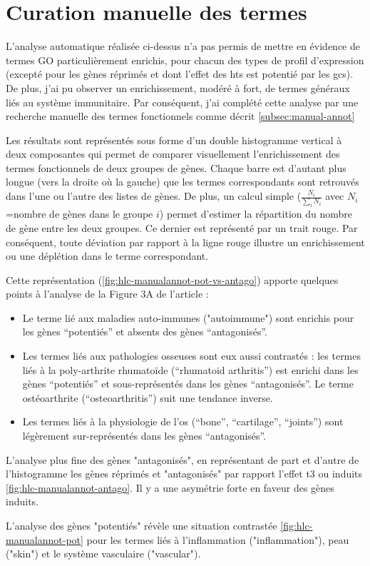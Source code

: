 \documentclass[../main.tex]{subfiles}
\begin{document}
\section{Curation manuelle des termes}
L'analyse automatique réalisée ci-dessus n'a pas permis de mettre en évidence de termes GO particulièrement enrichis, pour chacun des types de profil d'expression (excepté pour les gènes réprimés et dont l'effet des \glspl{ht} est potentié par les \glspl{gc}).
De plus, j'ai pu observer un enrichissement, modéré à fort, de termes généraux liés au système immunitaire. Par conséquent, j'ai complété cette analyse par une recherche manuelle des termes fonctionnels comme décrit \autoref{subsec:manual-annot}
\par
Les résultats sont représentés sous forme d'un double histogramme vertical à deux composantes qui permet de comparer visuellement l'enrichissement des termes fonctionnels de deux groupes de gènes.
Chaque barre est d'autant plus longue (vers la droite où la gauche) que les termes correspondants sont retrouvés dans l'une ou l'autre des listes de gènes.
De plus, un calcul simple ($\frac{N_{i}}{\sum_{i}N_{i}}$ avec $N_i$=nombre de gènes dans le groupe $i$) permet d'estimer la répartition du nombre de gène entre les deux groupes.
Ce dernier est représenté par un trait rouge. Par conséquent, toute déviation par rapport à la ligne rouge illustre un enrichissement ou une déplétion dans le terme correspondant.
\par
Cette représentation (\autoref{fig:hlc-manualannot-pot-vs-antago}) apporte quelques points à l'analyse de la Figure 3A de l'article :
\begin{itemize} 
\item Le terme lié aux maladies auto-immunes ("autoimmune") sont enrichis pour les gènes ``potentiés'' et absents des gènes ``antagonisés''. 
\item Les termes liés aux pathologies osseuses sont eux aussi contrastés :
les termes liés à la poly-arthrite rhumatoïde (``rhumatoid arthritis'') est enrichi dans les gènes ``potentiés'' et sous-représentés dans les gènes ``antagonisés''.
Le terme ostéoarthrite (``osteoarthritis'') suit une tendance inverse.
\item Les termes liés à la physiologie de l'os (``bone'', ``cartilage'', ``joints'') sont légèrement sur-représentés dans les gènes ``antagonisés''.
\end{itemize}


L'analyse plus fine des gènes "antagonisés", en représentant de part et d'autre de l'histogramme les gènes réprimés et "antagonisés" par rapport l'effet \gls{t3} ou induits \autoref{fig:hlc-manualannot-antago}.
Il y a une asymétrie forte en faveur des gènes induits.



L'analyse des gènes "potentiés" révèle une situation contrastée \autoref{fig:hlc-manualannot-pot} pour les termes liés à l'inflammation ("inflammation"), peau ("skin") et le système vasculaire ("vascular"). 


\end{document}
